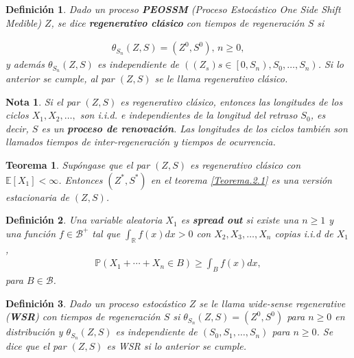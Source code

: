 \documentclass{article}
\newtheorem{Def}{Definición}[section]
\newtheorem{Teo}{Teorema}%
\newtheorem{Note}{Nota}%
\newcommand{\rea}{\mathbb{R}}
\newcommand{\esp}{\mathbb{E}}
\newcommand{\prob}{\mathbb{P}}
\numberwithin{equation}{section}
\begin{document}
\begin{Def}
Dado un proceso \textbf{PEOSSM} (Proceso Estoc\'astico One Side Shift Medible) $Z$, se dice \textbf{regenerativo cl\'asico} con tiempos de regeneraci\'on $S$ si 

\begin{eqnarray*}
\theta_{S_{n}}\left(Z,S\right)=\left(Z^{0},S^{0}\right)\textrm{, }n\geq0,
\end{eqnarray*}
y adem\'as $\theta_{S_{n}}\left(Z,S\right)$ es independiente de $\left(\left(Z_{s}\right)s\in\left[0,S_{n}\right),S_{0},\ldots,S_{n}\right)$. Si lo anterior se cumple, al par $\left(Z,S\right)$ se le llama regenerativo cl\'asico.
\end{Def}

\begin{Note}
Si el par $\left(Z,S\right)$ es regenerativo cl\'asico, entonces las longitudes de los ciclos $X_{1},X_{2},\ldots,$ son i.i.d. e independientes de la longitud del retraso $S_{0}$, es decir, $S$ es un \textbf{proceso de renovaci\'on}. Las longitudes de los ciclos tambi\'en son llamados tiempos de inter-regeneraci\'on y tiempos de ocurrencia.

\end{Note}

\begin{Teo}\label{Teo.3.1}
Sup\'ongase que el par $\left(Z,S\right)$ es regenerativo cl\'asico con $\esp\left[X_{1}\right]<\infty$. Entonces $\left(Z^{*},S^{*}\right)$ en el teorema \ref{Teorema.2.1} es una versi\'on estacionaria de $\left(Z,S\right)$.
\end{Teo}


\begin{Def}
Una variable aleatoria $X_{1}$ es \textbf{spread out} si existe una $n\geq1$ y una  funci\'on $f\in\mathcal{B}^{+}$ tal que $\int_{\rea}f\left(x\right)dx>0$ con $X_{2},X_{3},\ldots,X_{n}$ copias i.i.d  de $X_{1}$, 
\begin{eqnarray}
\prob\left(X_{1}+\cdots+X_{n}\in B\right)\geq\int_{B}f\left(x\right)dx,
\end{eqnarray}
 para $B\in\mathcal{B}$.
\end{Def}

\begin{Def}
Dado un proceso estoc\'astico $Z$ se le llama \textit{wide-sense regenerative} (\textbf{WSR}) con tiempos de regeneraci\'on $S$ si $\theta_{S_{n}}\left(Z,S\right)=\left(Z^{0},S^{0}\right)$ para $n\geq0$ en distribuci\'on y $\theta_{S_{n}}\left(Z,S\right)$ es independiente de $\left(S_{0},S_{1},\ldots,S_{n}\right)$ para $n\geq0$.
Se dice que el par $\left(Z,S\right)$ es WSR si lo anterior se cumple.
\end{Def}
\end{document}
